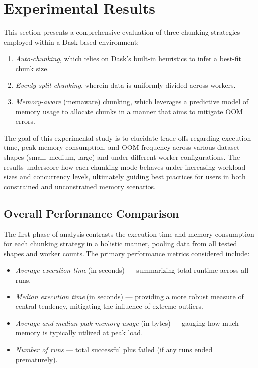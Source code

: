 \section{Experimental Results}
\label{sec:idp-experimental-results}

This section presents a comprehensive evaluation of three chunking strategies employed within a Dask-based environment:
\begin{enumerate}
    \item \emph{Auto-chunking}, which relies on Dask's built-in heuristics to infer a best-fit chunk size.
    \item \emph{Evenly-split chunking}, wherein data is uniformly divided across workers.
    \item \emph{Memory-aware} (memaware) chunking, which leverages a predictive model of memory usage to allocate chunks in a manner that aims to mitigate \ac{OOM} errors.
\end{enumerate}
The goal of this experimental study is to elucidate trade-offs regarding execution time, peak memory consumption, and \ac{OOM} frequency across various dataset shapes (small, medium, large) and under different worker configurations.
The results underscore how each chunking mode behaves under increasing workload sizes and concurrency levels, ultimately guiding best practices for users in both constrained and unconstrained memory scenarios.

\subsection{Overall Performance Comparison}
\label{subsec:overall-performance}

The first phase of analysis contrasts the execution time and memory consumption for each chunking strategy in a holistic manner, pooling data from all tested shapes and worker counts.
The primary performance metrics considered include:
\begin{itemize}
    \item \emph{Average execution time} (in seconds) --- summarizing total runtime across all runs.
    \item \emph{Median execution time} (in seconds) --- providing a more robust measure of central tendency, mitigating the influence of extreme outliers.
    \item \emph{Average and median peak memory usage} (in bytes) --- gauging how much memory is typically utilized at peak load.
    \item \emph{Number of runs} --- total successful plus failed (if any runs ended prematurely).
\end{itemize}

